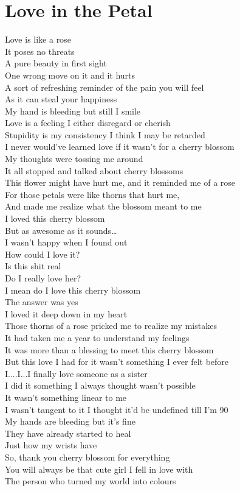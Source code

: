 \documentclass[12pt, b5paper]{article}
\begin{document}
\section{Love in the Petal}
Love is like a rose
\\It poses no threats
\\A pure beauty in first sight 
\\One wrong move on it and it hurts
\\A sort of refreshing reminder of the pain you will feel
\\As it can steal your happiness
\\My hand is bleeding but still I smile
\\Love is a feeling I either disregard or cherish
\\Stupidity is my consistency I think I may be retarded
\\I never would’ve learned love if it wasn’t for a cherry blossom
\\My thoughts were tossing me around
\\It all stopped and talked about cherry blossoms
\\This flower might have hurt me, and it reminded me of a rose
\\For those petals  were like thorns that hurt me, 
\\And made me realize what the blossom meant to me 
\\I loved this cherry blossom
\\But as awesome as it sounds\dots
\\I wasn’t happy when I found out 
\\How could I love it? 
\\Is this shit real 
\\Do I really love her? 
\\I mean do I love this cherry blossom 
\\The answer was yes 
\\I loved it deep down in my heart 
\\Those thorns of a rose pricked me to realize my mistakes
\\It had taken me a year to understand my feelings
\\It was more than a blessing to meet this cherry blossom 
\\But this love I had for it wasn’t something I ever felt before 
\\I....I...I finally love someone as a sister
\\I did it something I always thought wasn’t possible 
\\It wasn’t something linear to me 
\\I wasn’t tangent to it I thought it’d be undefined till I’m 90
\\My hands are bleeding but it's fine 
\\They have already started to heal
\\Just how my wrists have 
\\So, thank you cherry blossom for everything 
\\You will always be that cute girl I fell in love with 
\\The person who turned my world into colours
\end{document}
